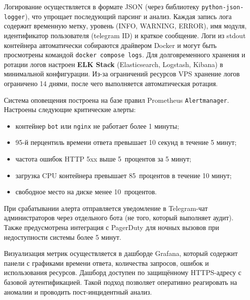 {	\par \redline Логирование осуществляется в формате JSON (через библиотеку \texttt{python-json-logger}), что упрощает последующий парсинг и анализ.
	Каждая запись лога содержит временную метку, уровень (INFO, WARNING, ERROR), имя модуля, идентификатор пользователя (telegram ID) и краткое сообщение.
	Логи из stdout контейнера автоматически собираются драйвером Docker и могут быть просмотрены командой \texttt{docker compose logs}.
	Для долговременного хранения и ротации логов настроен \textbf{ELK Stack} (Elasticsearch, Logstash, Kibana) в минимальной конфигурации.
	Из-за ограничений ресурсов VPS хранение логов ограничено 14 днями, после чего выполняется автоматическая ротация.
	\par \redline Система оповещения построена на базе правил Prometheus \texttt{Alertmanager}.
	Настроены следующие критические алерты:
	\begin{itemize}[leftmargin=2.15cm, labelwidth=0.65cm, labelsep=0.0cm]
		\item[•] контейнер \texttt{bot} или \texttt{nginx} не работает более 1 минуты;
		\item[•] 95-й перцентиль времени ответа превышает 10 секунд в течение 5 минут;
		\item[•] частота ошибок HTTP 5xx выше 5~процентов за 5 минут;
		\item[•] загрузка CPU контейнера превышает 85~процентов в течение 10 минут;
		\item[•] свободное место на диске менее 10~процентов.
	\end{itemize}
	При срабатывании алерта отправляется уведомление в Telegram-чат администраторов через отдельного бота (не того, который выполняет аудит).
	Также предусмотрена интеграция с PagerDuty для ночных вызовов при недоступности системы более 5 минут.
	\par \redline Визуализация метрик осуществляется в дашборде Grafana, который содержит панели с графиками времени ответа, количества запросов, ошибок и использования ресурсов.
	Дашборд доступен по защищённому HTTPS-адресу с базовой аутентификацией. Такой подход позволяет оперативно реагировать на аномалии и проводить пост-инцидентный анализ.
	\par
}

